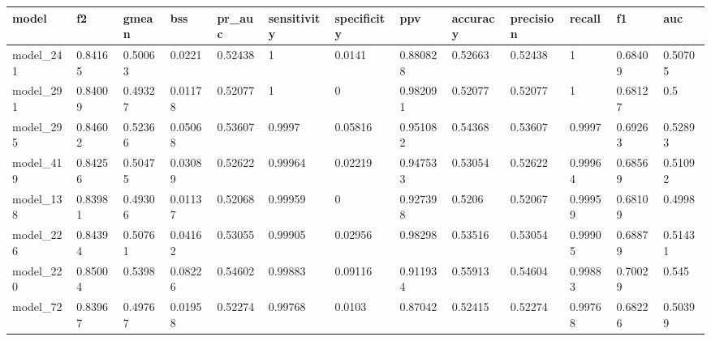 \begin{tabular}{|l|l|l|l|l|l|l|l|l|l|l|l|l|}
\hline
\textbf{model} & \textbf{f2} & \textbf{gmean} & \textbf{bss} & \textbf{pr\_auc} & \textbf{sensitivity} & \textbf{specificity} & \textbf{ppv} & \textbf{accuracy} & \textbf{precision} & \textbf{recall} & \textbf{f1} & \textbf{auc} \\ \hline
model\_241     & 0.84165     & 0.50063        & 0.0221       & 0.52438          & 1                    & 0.0141               & 0.880828     & 0.52663           & 0.52438            & 1               & 0.68409     & 0.50705      \\ \hline
model\_291     & 0.84009     & 0.49327        & 0.01178      & 0.52077          & 1                    & 0                    & 0.982091     & 0.52077           & 0.52077            & 1               & 0.68127     & 0.5          \\ \hline
model\_295     & 0.84602     & 0.52366        & 0.05068      & 0.53607          & 0.9997               & 0.05816              & 0.951082     & 0.54368           & 0.53607            & 0.9997          & 0.69263     & 0.52893      \\ \hline
model\_419     & 0.84256     & 0.50475        & 0.03089      & 0.52622          & 0.99964              & 0.02219              & 0.947533     & 0.53054           & 0.52622            & 0.99964         & 0.68569     & 0.51092      \\ \hline
model\_138     & 0.83981     & 0.49306        & 0.01137      & 0.52068          & 0.99959              & 0                    & 0.927398     & 0.5206            & 0.52067            & 0.99959         & 0.68109     & 0.4998       \\ \hline
model\_226     & 0.84394     & 0.50761        & 0.04162      & 0.53055          & 0.99905              & 0.02956              & 0.98298      & 0.53516           & 0.53054            & 0.99905         & 0.68879     & 0.51431      \\ \hline
model\_220     & 0.85004     & 0.5398         & 0.08226      & 0.54602          & 0.99883              & 0.09116              & 0.911934     & 0.55913           & 0.54604            & 0.99883         & 0.70029     & 0.545        \\ \hline
model\_72      & 0.83967     & 0.49767        & 0.01958      & 0.52274          & 0.99768              & 0.0103               & 0.87042      & 0.52415           & 0.52274            & 0.99768         & 0.68226     & 0.50399      \\ \hline

\end{tabular}
